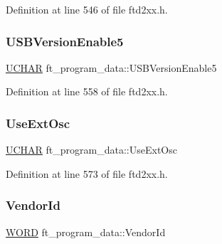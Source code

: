 Definition at line 546 of file ftd2xx.\+h.

\mbox{\label{structft__program__data_add93538aae456427d1d922891d98c97c}} 
\subsubsection{\texorpdfstring{U\+S\+B\+Version\+Enable5}{USBVersionEnable5}}
{\footnotesize\ttfamily \hyperlink{CatCaloProto40MHz_2inc_2WinTypes_8h_a4f4bb67531a9bf6f0b9c6ad76aeba587}{U\+C\+H\+AR} ft\+\_\+program\+\_\+data\+::\+U\+S\+B\+Version\+Enable5}



Definition at line 558 of file ftd2xx.\+h.

\mbox{\label{structft__program__data_a93dee33ac5847f65157c3c5e374fa4ea}} 
\subsubsection{\texorpdfstring{Use\+Ext\+Osc}{UseExtOsc}}
{\footnotesize\ttfamily \hyperlink{CatCaloProto40MHz_2inc_2WinTypes_8h_a4f4bb67531a9bf6f0b9c6ad76aeba587}{U\+C\+H\+AR} ft\+\_\+program\+\_\+data\+::\+Use\+Ext\+Osc}



Definition at line 573 of file ftd2xx.\+h.

\mbox{\label{structft__program__data_a4d4e65a934b3a822d90d2b2fc461cb11}} 
\subsubsection{\texorpdfstring{Vendor\+Id}{VendorId}}
{\footnotesize\ttfamily \hyperlink{CatCaloProto40MHz_2inc_2WinTypes_8h_a197942eefa7db30960ae396d68339b97}{W\+O\+RD} ft\+\_\+program\+\_\+data\+::\+Vendor\+Id}



